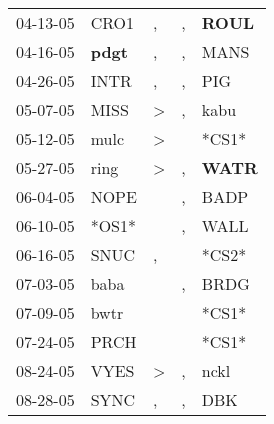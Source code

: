 \begin{supertabular}{p{0.07\textwidth}p{0.06\textwidth}p{0.02\textwidth}p{0.02\textwidth}p{0.06\textwidth}}
          04-13-05\textsuperscript{} &           CRO1\textsuperscript{} &                , &                , &  \textbf{ROUL\textsuperscript{}} \\
          04-16-05\textsuperscript{} &  \textbf{pdgt\textsuperscript{}} &                , &                , &           MANS\textsuperscript{} \\
          04-26-05\textsuperscript{} &           INTR\textsuperscript{} &                , &                , &            PIG\textsuperscript{} \\
          05-07-05\textsuperscript{} &           MISS\textsuperscript{} &     \textgreater &                , &           kabu\textsuperscript{} \\
          05-12-05\textsuperscript{} &           mulc\textsuperscript{} &     \textgreater &                  &                            *CS1* \\
          05-27-05\textsuperscript{} &           ring\textsuperscript{} &     \textgreater &                , &  \textbf{WATR\textsuperscript{}} \\
          06-04-05\textsuperscript{} &           NOPE\textsuperscript{} &                  &                , &           BADP\textsuperscript{} \\
          06-10-05\textsuperscript{} &                            *OS1* &                  &                , &           WALL\textsuperscript{} \\
          06-16-05\textsuperscript{} &           SNUC\textsuperscript{} &                , &                  &                            *CS2* \\
          07-03-05\textsuperscript{} &           baba\textsuperscript{} &                  &                , &           BRDG\textsuperscript{} \\
          07-09-05\textsuperscript{} &           bwtr\textsuperscript{} &                  &                  &                            *CS1* \\
          07-24-05\textsuperscript{} &           PRCH\textsuperscript{} &                  &                  &                            *CS1* \\
          08-24-05\textsuperscript{} &           VYES\textsuperscript{} &     \textgreater &                , &           nckl\textsuperscript{} \\
          08-28-05\textsuperscript{} &           SYNC\textsuperscript{} &                , &                , &            DBK\textsuperscript{} \\

\end{supertabular}
